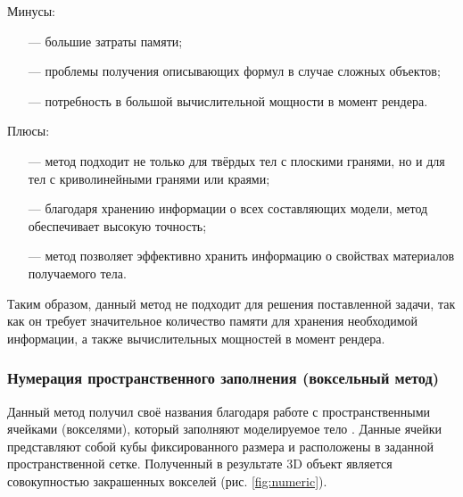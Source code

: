 Минусы:
\begin{itemize}[leftmargin=1.6\parindent]
	\item[---] большие затраты памяти;
	\item[---] проблемы получения описывающих формул в случае сложных объектов;
	\item[---] потребность в большой вычислительной мощности в момент рендера.
\end{itemize}

Плюсы:
\begin{itemize}[leftmargin=1.6\parindent]
	\item[---] метод подходит не только для твёрдых тел с плоскими гранями, но и для 
	тел с криволинейными гранями или краями;
	\item[---] благодаря хранению информации о всех составляющих модели, метод 
	обеспечивает высокую точность;
	\item[---] метод позволяет эффективно хранить информацию о свойствах материалов получаемого тела.
\end{itemize}

Таким образом, данный метод не подходит для решения поставленной 
задачи, так как он требует значительное количество памяти для хранения 
необходимой информации, а также вычислительных мощностей в момент 
рендера.

\subsubsection{Нумерация пространственного заполнения (воксельный метод)} \label{sec:numeric}

Данный метод получил своё названия благодаря работе с 
пространственными ячейками (вокселями), который заполняют моделируемое 
тело \cite{numeric-octree}.
Данные ячейки представляют собой кубы фиксированного размера и 
расположены в заданной пространственной сетке.
Полученный в результате 3D 
объект является совокупностью закрашенных вокселей (рис. \ref{fig:numeric}). 

